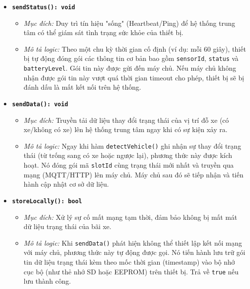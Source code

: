 \begin{itemize}
\begin{itemize}
        \item \textbf{\texttt{sendStatus(): void}}
        \begin{itemize}
            \item \textit{Mục đích:} Duy trì tín hiệu "sống" (Heartbeat/Ping) để hệ thống trung tâm có thể giám sát tình trạng sức khỏe của thiết bị.
            \item \textit{Mô tả logic:} Theo một chu kỳ thời gian cố định (ví dụ: mỗi 60 giây), thiết bị tự động đóng gói các thông tin cơ bản bao gồm \texttt{sensorId}, \texttt{status} và \texttt{batteryLevel}. Gói tin này được gửi đến máy chủ. Nếu máy chủ không nhận được gói tin này vượt quá thời gian timeout cho phép, thiết bị sẽ bị đánh dấu là mất kết nối trên hệ thống.
        \end{itemize}

        \item \textbf{\texttt{sendData(): void}}
        \begin{itemize}
            \item \textit{Mục đích:} Truyền tải dữ liệu thay đổi trạng thái của vị trí đỗ xe (có xe/không có xe) lên hệ thống trung tâm ngay khi có sự kiện xảy ra.
            \item \textit{Mô tả logic:} Ngay khi hàm \texttt{detectVehicle()} ghi nhận sự thay đổi trạng thái (từ trống sang có xe hoặc ngược lại), phương thức này được kích hoạt. Nó đóng gói mã \texttt{slotId} cùng trạng thái mới nhất và truyền qua mạng (MQTT/HTTP) lên máy chủ. Máy chủ sau đó sẽ tiếp nhận và tiến hành cập nhật cơ sở dữ liệu.
        \end{itemize}

        \item \textbf{\texttt{storeLocally(): bool}}
        \begin{itemize}
            \item \textit{Mục đích:} Xử lý sự cố mất mạng tạm thời, đảm bảo không bị mất mát dữ liệu trạng thái của bãi xe.
            \item \textit{Mô tả logic:} Khi \texttt{sendData()} phát hiện không thể thiết lập kết nối mạng với máy chủ, phương thức này tự động được gọi. Nó tiến hành lưu trữ gói tin dữ liệu trạng thái kèm theo mốc thời gian (timestamp) vào bộ nhớ cục bộ (như thẻ nhớ SD hoặc EEPROM) trên thiết bị. Trả về \texttt{true} nếu lưu thành công.
        \end{itemize}


\end{itemize}
\end{itemize}
